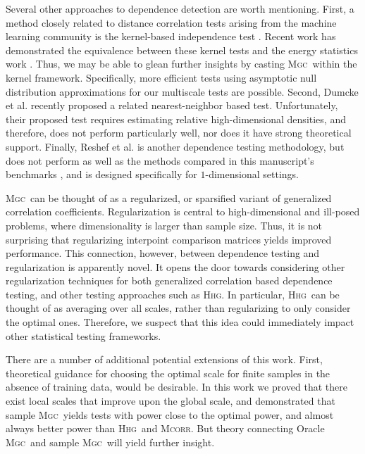 \documentclass[11pt]{article}
\providecommand{\sct}[1]{{\normalfont\textsc{#1}}}
\newcommand{\Mgc}{\sct{Mgc}}
\newcommand{\Hhg}{\sct{Hhg}}
\newcommand{\Mcorr}{\sct{Mcorr}}
\begin{document}
Several other approaches to dependence detection are worth mentioning.
First, a method closely related to distance correlation tests arising from the machine learning community is the kernel-based independence test  \cite{GrettonEtAl2005, GrettonGyorfi2010, GrettonEtAl2012}.  Recent work has demonstrated the equivalence between these kernel tests and the energy statistics work \cite{SejdinovicEtAl2013, RamdasEtAl2015}. Thus, we may be able to glean further insights by casting \Mgc~within the kernel framework. Specifically, more efficient tests using asymptotic null distribution approximations for our multiscale tests are possible.
Second, Dumcke et al. \cite{Dumcke2014} recently proposed a related nearest-neighbor based test.  Unfortunately, their proposed test requires estimating relative high-dimensional densities, and therefore, does not perform particularly well, nor does it have strong theoretical support.
Finally, Reshef et al. \cite{Reshef2011} is another dependence testing methodology, but does not perform as well as the methods compared in this manuscript's  benchmarks \cite{SimonTibshirani2012}, and is designed specifically for $1$-dimensional settings.


 \Mgc~can be thought of as a regularized, or sparsified variant of generalized correlation coefficients.  Regularization is central to high-dimensional and ill-posed problems, where dimensionality is larger than sample size.  Thus, it is not surprising that regularizing interpoint comparison matrices yields improved performance.  This connection, however, between dependence testing and regularization is apparently novel.  It opens the door towards considering other regularization techniques for both generalized correlation based dependence testing, and other testing approaches such as \Hhg. In particular, \Hhg~can be thought of as averaging over all scales, rather than regularizing to only consider the optimal ones.  Therefore, we suspect that this idea could immediately impact other statistical testing frameworks.



There are a number of additional potential extensions of this work.  First, theoretical guidance for choosing the optimal scale for finite samples  in the absence of training data, would be desirable. 
In this work we proved that there exist local scales that improve upon the global scale, and demonstrated that sample \Mgc~yields tests with power close to the optimal power, and almost always better power than \Hhg~and \Mcorr.  But  theory connecting Oracle \Mgc~and  sample \Mgc~will yield further insight.
\end{document}
